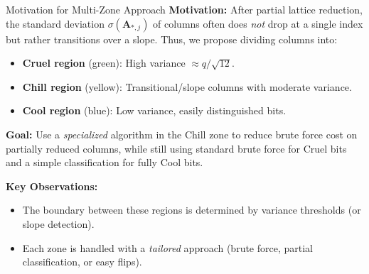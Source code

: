 \documentclass{beamer}
\begin{document}
\begin{frame}{Motivation for Multi-Zone Approach}
\textbf{Motivation:} After partial lattice reduction, the standard deviation $\sigma(\mathbf{A}_{*,j})$ of columns
often does \emph{not} drop at a single index but rather transitions over a slope.
Thus, we propose dividing columns into:
\begin{itemize}
  \item \textbf{Cruel region} (green): High variance $\approx q/\sqrt{12}$.
  \item \textbf{Chill region} (yellow): Transitional/slope columns with moderate variance.
  \item \textbf{Cool region} (blue): Low variance, easily distinguished bits.
\end{itemize}

\textbf{Goal:} Use a \emph{specialized} algorithm in the Chill zone to reduce brute force cost on partially reduced columns,
while still using standard brute force for Cruel bits and a simple classification for fully Cool bits.

\vspace{0.3cm}
\textbf{Key Observations:}
\begin{itemize}
  \item The boundary between these regions is determined by variance thresholds (or slope detection).
  \item Each zone is handled with a \emph{tailored} approach (brute force, partial classification, or easy flips).
\end{itemize}
\end{frame}
\end{document}
